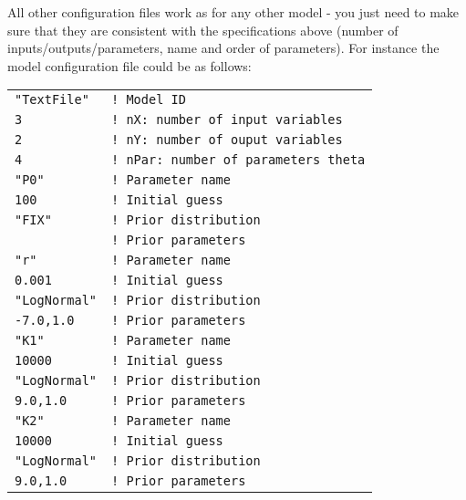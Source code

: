 \documentclass[a4paper]{article}
\begin{document}
All other configuration files work as for any other model - you just need to make sure that they are consistent with the specifications above (number of inputs/outputs/parameters, name and order of parameters). For instance the model configuration file could be as follows:

\begin{tcolorbox}
	\begin{tabular}{ll}
		\texttt{"TextFile"} & \texttt{! Model ID}\\
		\texttt{3} & \texttt{! nX: number of input variables}\\
		\texttt{2} & \texttt{! nY: number of ouput variables}\\
		\texttt{4} & \texttt{! nPar: number of parameters theta}\\
		\texttt{"P0"} & \texttt{! Parameter name}\\
		\texttt{100} & \texttt{! Initial guess}\\
		\texttt{"FIX"} & \texttt{! Prior distribution}\\
		\texttt{} & \texttt{! Prior parameters}\\
		\texttt{"r"} & \texttt{! Parameter name}\\
		\texttt{0.001} & \texttt{! Initial guess}\\
		\texttt{"LogNormal"} & \texttt{! Prior distribution}\\
		\texttt{-7.0,1.0} & \texttt{! Prior parameters}\\
		\texttt{"K1"} & \texttt{! Parameter name}\\
		\texttt{10000} & \texttt{! Initial guess}\\
		\texttt{"LogNormal"} & \texttt{! Prior distribution}\\
		\texttt{9.0,1.0} & \texttt{! Prior parameters}\\
		\texttt{"K2"} & \texttt{! Parameter name}\\
		\texttt{10000} & \texttt{! Initial guess}\\
		\texttt{"LogNormal"} & \texttt{! Prior distribution}\\
		\texttt{9.0,1.0} & \texttt{! Prior parameters}\\	\end{tabular}
\end{tcolorbox}
\end{document}
